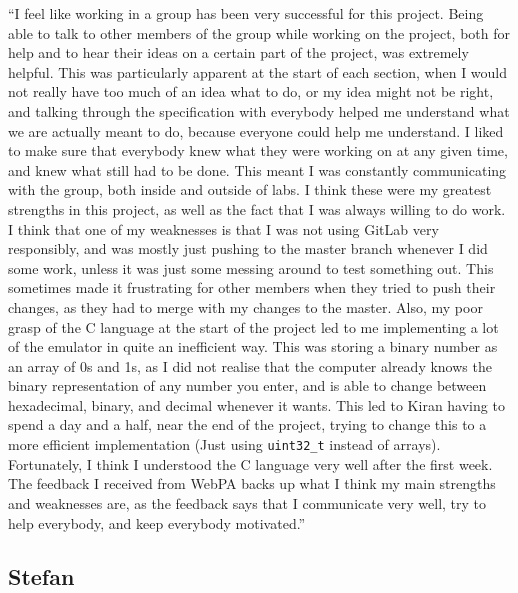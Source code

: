 \documentclass[a4wide, 10pt]{article}
\begin{document}
\textquotedblleft I feel like working in a group has been very successful for this project. Being able to talk to other members of the group while working on the project, both for help and to hear their ideas on a certain part of the project, was extremely helpful. This was particularly apparent at the start of each section, when I would not really have too much of an idea what to do, or my idea might not be right, and talking through the specification with everybody helped me understand what we are actually meant to do, because everyone could help me understand. I liked to make sure that everybody knew what they were working on at any given time, and knew what still had to be done. This meant I was constantly communicating with the group, both inside and outside of labs. I think these were my greatest strengths in this project, as well as the fact that I was always willing to do work. I think that one of my weaknesses is that I was not using GitLab very responsibly, and was mostly just pushing to the master branch whenever I did some work, unless it was just some messing around to test something out. This sometimes made it frustrating for other members when they tried to push their changes, as they had to merge with my changes to the master. Also, my poor grasp of the C language at the start of the project led to me implementing a lot of the emulator in quite an inefficient way. This was storing a binary number as an array of 0s and 1s, as I did not realise that the computer already knows the binary representation of any number you enter, and is able to change between hexadecimal, binary, and decimal whenever it wants. This led to Kiran having to spend a day and a half, near the end of the project, trying to change this to a more efficient implementation (Just using \texttt{uint32\_t} instead of arrays). Fortunately, I think I understood the C language very well after the first week. The feedback I received from WebPA backs up what I think my main strengths and weaknesses are, as the feedback says that I communicate very well, try to help everybody, and keep everybody motivated.\textquotedblright

\subsection*{Stefan}
\end{document}
